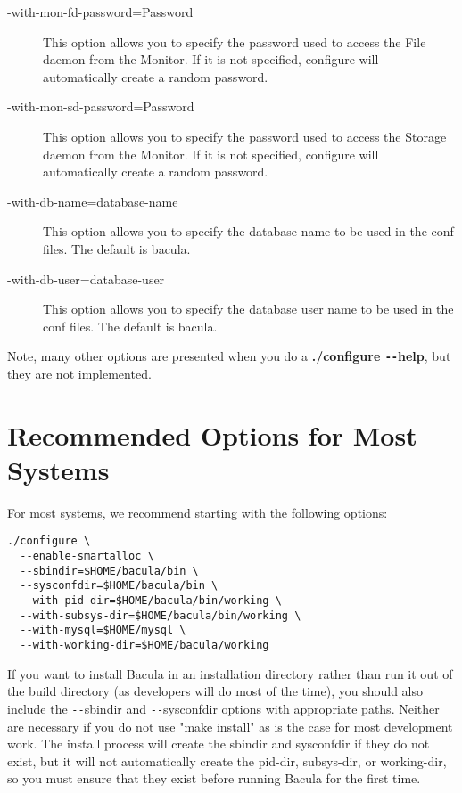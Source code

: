 \begin{description}
\item [ {-}{\-}with-mon-fd-password=\lt{}Password\gt{} ]
   This option allows you to specify the password used to  access the File daemon
   from the Monitor.  If it is not specified, configure will
   automatically create a random  password.  

\item [ {-}{\-}with-mon-sd-password=\lt{}Password\gt{} ]
   This option allows you to specify the password used to  access the
   Storage daemon from the Monitor. If it is not specified, configure will
   automatically create a random  password.  

\item [ {-}{\-}with-db-name=\lt{}database-name\gt{} ]
   This option allows you to specify the database name to be used in
   the conf files.  The default is bacula.

\item [ {-}{\-}with-db-user=\lt{}database-user\gt{} ]
   This option allows you to specify the database user name to be used in
   the conf files.  The default is bacula.

\end{description}

Note, many other options are presented when you do a {\bf ./configure
\verb:--:help}, but they are not implemented.

\section{Recommended Options for Most Systems}

For most systems, we recommend starting with the following options: 

\footnotesize
\begin{verbatim}
./configure \
  --enable-smartalloc \
  --sbindir=$HOME/bacula/bin \
  --sysconfdir=$HOME/bacula/bin \
  --with-pid-dir=$HOME/bacula/bin/working \
  --with-subsys-dir=$HOME/bacula/bin/working \
  --with-mysql=$HOME/mysql \
  --with-working-dir=$HOME/bacula/working
\end{verbatim}
\normalsize

If you want to install Bacula in an installation directory rather than run it
out of the build directory (as developers will do most of the time), you
should also include the \verb:--:sbindir and \verb:--:sysconfdir options with appropriate
paths. Neither are necessary if you do not use "make install" as is the case
for most development work. The install process will create the sbindir and
sysconfdir if they do not exist, but it will not automatically create the
pid-dir, subsys-dir, or working-dir, so you must ensure that they exist before
running Bacula for the first time.


